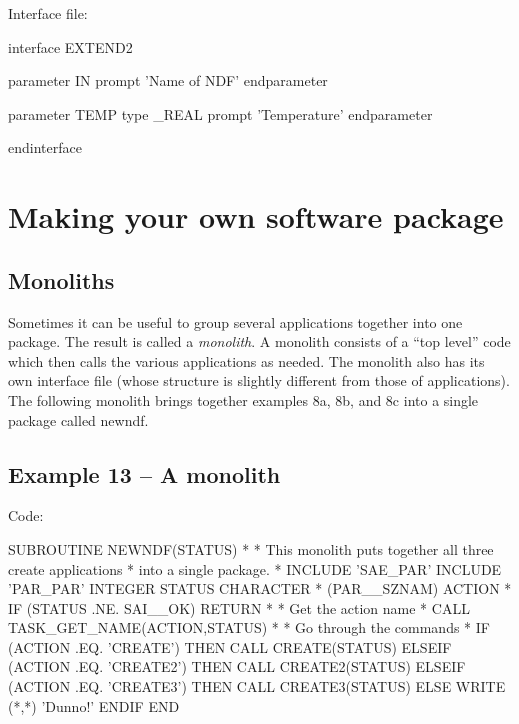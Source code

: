 \documentclass[11pt,nolof]{starlink}
\begin{document}
Interface file:

\begin{small}
\begin{terminalv}
interface EXTEND2

  parameter IN
  prompt 'Name of NDF'
  endparameter

  parameter TEMP
  type _REAL
  prompt 'Temperature'
  endparameter

endinterface
\end{terminalv}
\end{small}

\section{Making your own software package}

\subsection{Monoliths}

Sometimes it can be useful to group several applications together into
one package. The result is called a \emph{monolith}. A monolith consists
of a ``top level'' code which then calls the various applications as needed.
The monolith also has its own interface file (whose structure is slightly
different from those of applications). The following monolith brings
together examples 8a, 8b, and 8c into a single package called \textsf{newndf}.

\subsection{Example 13 -- A monolith}

Code:

\begin{small}
\begin{terminalv}
       SUBROUTINE NEWNDF(STATUS)
*
* This monolith puts together all three create applications
* into a single package.
*
       INCLUDE 'SAE_PAR'
       INCLUDE 'PAR_PAR'
       INTEGER STATUS
       CHARACTER * (PAR__SZNAM) ACTION
*
       IF (STATUS .NE. SAI__OK) RETURN
*
* Get the action name
*
       CALL TASK_GET_NAME(ACTION,STATUS)
*
* Go through the commands
*
       IF (ACTION .EQ. 'CREATE') THEN
         CALL CREATE(STATUS)
       ELSEIF (ACTION .EQ. 'CREATE2') THEN
         CALL CREATE2(STATUS)
       ELSEIF (ACTION .EQ. 'CREATE3') THEN
         CALL CREATE3(STATUS)
       ELSE
         WRITE (*,*) 'Dunno!'
       ENDIF
       END
\end{terminalv}
\end{small}
\end{document}
